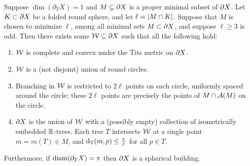 \documentclass{amsart}
\newcommand{\bdT}{\partial_T}
\begin{document}
\begin{lemma}			\label{odd case}
Suppose $\dim(\bdT X) = 1$ and $M \subsetneq \partial X$ is a proper minimal subset of $\partial X$.  Let $K \subset \partial X$ be a folded round sphere, and let $\ell = \left| M \cap K \right|$.  Suppose that $M$ is chosen to minimize $\ell$, among all minimal sets $M \subset \partial X$, and suppose $\ell \ge 3$ is odd.  Then there exists some $\mathcal W \subseteq \partial X$ such that all the following hold:
\begin{enumerate}
\item			\label{odd:convex}
$\mathcal W$ is complete and convex under the Tits metric on $\partial X$.
\item			\label{odd:union}
$\mathcal W$ is a (not disjoint) union of round circles.
\item			\label{odd:branching}
Branching in $\mathcal W$ is restricted to $2 \ell$ points on each circle, uniformly spaced around the circle; these $2 \ell$ points are precisely the points of $M \cap \operatorname{\mathcal A}(M)$ on the circle.
\item			\label{odd:trees}
$\partial X$ is the union of $\mathcal W$ with a (possibly empty) collection of isometrically embedded $\mathbb{R}$-trees.  Each tree $T$ intersects $\mathcal W$ at a single point $m = m(T) \in M$, and $\operatorname{d_T}(m,p) \le \frac{\pi}{\ell}$ for all $p \in T$.
\end{enumerate}
Furthermore, if $\diam (\bdT X) = \pi$ then $\partial X$ is a spherical building. \end{lemma}
\end{document}
